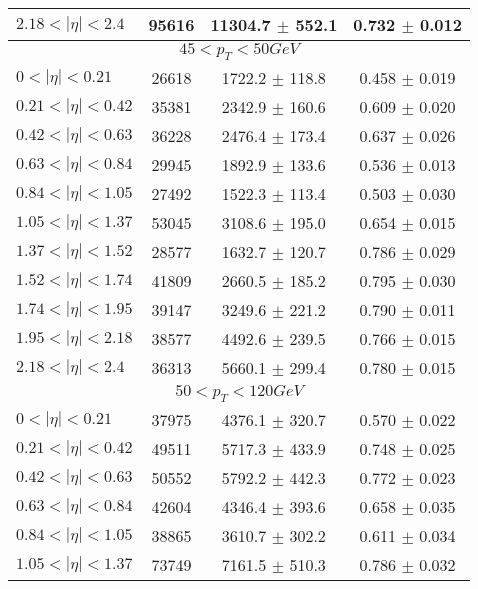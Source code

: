 \begin{tabular}{lccc}
$2.18 < |\eta| <2.4$           & 95616      & 11304.7    $\pm$ 552.1 & 0.732      $\pm$ 0.012 \\
\hline
\multicolumn{4}{c}{$45 < p_{T} < 50 GeV$} \\
\hline
$0 < |\eta| <0.21$             & 26618      & 1722.2     $\pm$ 118.8 & 0.458      $\pm$ 0.019 \\
$0.21 < |\eta| <0.42$          & 35381      & 2342.9     $\pm$ 160.6 & 0.609      $\pm$ 0.020 \\
$0.42 < |\eta| <0.63$          & 36228      & 2476.4     $\pm$ 173.4 & 0.637      $\pm$ 0.026 \\
$0.63 < |\eta| <0.84$          & 29945      & 1892.9     $\pm$ 133.6 & 0.536      $\pm$ 0.013 \\
$0.84 < |\eta| <1.05$          & 27492      & 1522.3     $\pm$ 113.4 & 0.503      $\pm$ 0.030 \\
$1.05 < |\eta| <1.37$          & 53045      & 3108.6     $\pm$ 195.0 & 0.654      $\pm$ 0.015 \\
$1.37 < |\eta| <1.52$          & 28577      & 1632.7     $\pm$ 120.7 & 0.786      $\pm$ 0.029 \\
$1.52 < |\eta| <1.74$          & 41809      & 2660.5     $\pm$ 185.2 & 0.795      $\pm$ 0.030 \\
$1.74 < |\eta| <1.95$          & 39147      & 3249.6     $\pm$ 221.2 & 0.790      $\pm$ 0.011 \\
$1.95 < |\eta| <2.18$          & 38577      & 4492.6     $\pm$ 239.5 & 0.766      $\pm$ 0.015 \\
$2.18 < |\eta| <2.4$           & 36313      & 5660.1     $\pm$ 299.4 & 0.780      $\pm$ 0.015 \\
\hline
\multicolumn{4}{c}{$50 < p_{T} < 120 GeV$} \\
\hline
$0 < |\eta| <0.21$             & 37975      & 4376.1     $\pm$ 320.7 & 0.570      $\pm$ 0.022 \\
$0.21 < |\eta| <0.42$          & 49511      & 5717.3     $\pm$ 433.9 & 0.748      $\pm$ 0.025 \\
$0.42 < |\eta| <0.63$          & 50552      & 5792.2     $\pm$ 442.3 & 0.772      $\pm$ 0.023 \\
$0.63 < |\eta| <0.84$          & 42604      & 4346.4     $\pm$ 393.6 & 0.658      $\pm$ 0.035 \\
$0.84 < |\eta| <1.05$          & 38865      & 3610.7     $\pm$ 302.2 & 0.611      $\pm$ 0.034 \\
$1.05 < |\eta| <1.37$          & 73749      & 7161.5     $\pm$ 510.3 & 0.786      $\pm$ 0.032 \\

\end{tabular}
